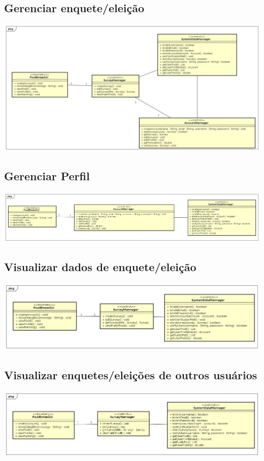 \documentclass[a4paper,12pt]{report}
\begin{document}
\subsection*{Gerenciar enquete/eleição}
\markright{}
\includegraphics[width=14.3cm]{class_diagrams/ProjectClassDiagramGerenciarEnquete.png}

\subsection*{Gerenciar Perfil}
\markright{}
\includegraphics[width=14.3cm]{class_diagrams/ProjectClassDiagramGerenciarPerfil.png}

\subsection*{Visualizar dados de enquete/eleição}
\markright{}
\includegraphics[width=14.3cm]{class_diagrams/ProjectClassDiagramVisualizarDadosEnquete.png}

\subsection*{Visualizar enquetes/eleições de outros usuários}
\markright{}
\includegraphics[width=14.3cm]{class_diagrams/ProjectClassDiagramVisualizarEnquetes.png}
\end{document}
